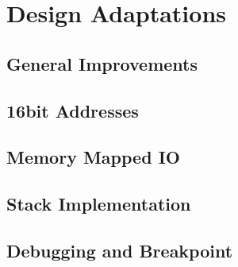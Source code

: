 \chapter{Design Adaptations}\label{cha:designChanges}
\section{General Improvements}\label{sec:improvements}
\section{16bit Addresses}
\section{Memory Mapped IO}
\section{Stack Implementation}
\section{Debugging and Breakpoint}